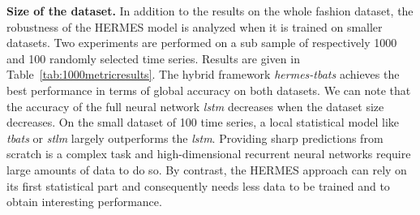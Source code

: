 \documentclass[10pt]{article} %
\begin{document}
\begin{table}
  \caption{\textit{tbats}, \textit{hermes-tbats} and \textit{hermes-tbats-ws} models confusion matrix}
\centering
\vspace{0.2cm}
\vspace{.2cm}
\vspace{.2cm}
\label{tab:tbatsclass}
\end{table}

\textbf{Size of the dataset. } In addition to the results on the whole fashion dataset, the robustness of the HERMES model is analyzed when it is trained on smaller datasets. Two experiments are performed on a sub sample of respectively 1000 and 100 randomly selected time series. Results are given in Table~\ref{tab:1000metricresults}. The hybrid framework \textit{hermes-tbats} achieves the best performance in terms of global accuracy on both datasets. 
We can note that the accuracy of the full neural network \textit{lstm} decreases when the dataset size decreases. On the small dataset of 100 time series, a local statistical model like \textit{tbats} or \textit{stlm} largely outperforms the \textit{lstm}. Providing sharp predictions from scratch is a complex task and high-dimensional recurrent neural networks require large amounts of data to do so. By contrast, the HERMES approach can rely on its first statistical part and consequently needs less data to be trained and to obtain interesting performance.
\end{document}
